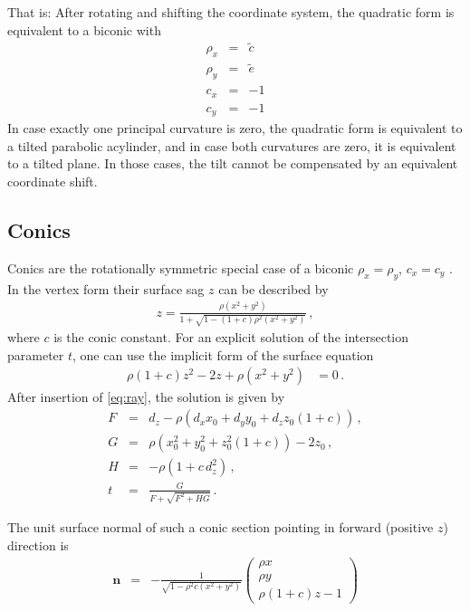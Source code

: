 \documentclass[12pt,a4paper,twoside,openright,BCOR10mm,headsepline,titlepage,abstracton,chapterprefix,final]{scrreprt}
\newcommand\Vector[1]{{\mathbf{#1}}}
\begin{document}
That is: 
After rotating and shifting the coordinate system, the quadratic form is equivalent to a biconic with
\begin{eqnarray}
 \rho_x &=& \tilde{c} \\
 \rho_y &=& \tilde{e} \\
 c_x &=& -1 \\
 c_y &=& -1
\end{eqnarray}
In case exactly one principal curvature is zero, the quadratic form is equivalent to a tilted parabolic acylinder, and in case both curvatures are zero, it is equivalent to a tilted plane.
In those cases, the tilt cannot be compensated by an equivalent coordinate shift.


\subsection{Conics}
Conics are the rotationally symmetric special case of a biconic $\rho_x = \rho_y$, $c_x = c_y$ .
In the vertex form their surface sag $z$ can be described by
\begin{eqnarray}
 z =  \frac
 { \rho ( x^2 + y^2 ) }
 { 1 + \sqrt{1 - (1+c) \rho^2  (x^2 + y^2)} }\,,
\end{eqnarray}
where $c$ is the conic constant. 
For an explicit solution of the intersection parameter $t$,
one can use the implicit form of the surface equation
\begin{align}
 \rho (1 + c) z^2 - 2 z + \rho (x^2 + y^2) &=0\,.
\end{align}
After insertion of \eqref{eq:ray}, the solution is given by
\begin{subequations}
\label{eq:intersectionconicsection}
\begin{eqnarray}
   F &=& d_z - \rho \left( d_x x_0 + d_y y_0 + d_z z_0 (1+c) \right)\,, \\
   G &=& \rho (x_0^2 + y_0^2 + z_0^2 (1+c)) - 2 z_0\,, \\
   H &=& - \rho ( 1 + c \, d_z^2 )\,, \\
   t &=& \frac{G}{ F + \sqrt{F^2 + H G} }\,.
\end{eqnarray}
\end{subequations}

The unit surface normal of such a conic section pointing in forward (positive $z$) direction is
\begin{eqnarray}
\Vector{n} &=& - \frac{1}{\sqrt{ 1 - \rho^2 c (x^2 + y^2)}} 
  \begin{pmatrix}
   \rho x \\
   \rho y \\
   \rho ( 1 + c ) z - 1
  \end{pmatrix}
\end{eqnarray}
\end{document}
